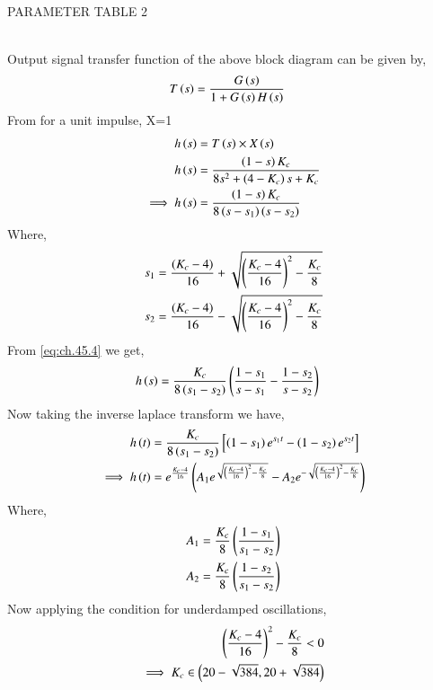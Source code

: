 \documentclass[journal,12pt,twocolumn]{IEEEtran}
\theoremstyle{remark}
\begin{document}
\begin{table}[ht]
    \centering
    
    \caption{PARAMETER TABLE 2}
    \label{tab:ch.45.2}
\end{table} \\
Output signal transfer function of the above block diagram can be given by,
\begin{align}
     T\left(s\right) &= \frac{G\left(s\right)}{1+G\left(s\right)H\left(s\right)}    
\end{align}
From 
for a unit impulse, X=1 \\
\begin{align}
    h\left(s\right) &= T\left(s\right)\times X\left(s\right)   \\
    h\left(s\right) &= \frac{\left(1-s\right)K_c}{8s^2 + \left(4-K_c\right)s + K_c}  \\
    \implies h\left(s\right) &= \frac{\left(1-s\right)K_c}{8\left(s-s_1\right)\left(s-s_2\right)}  \label{eq:ch.45.4}
\end{align}
Where,
\begin{align}
    s_1 &= \frac{\left(K_c-4\right)}{16} + \sqrt{\left(\frac{K_c-4}{16}\right)^2 - \frac{K_c}{8}}  \\
    s_2 &= \frac{\left(K_c-4\right)}{16} - \sqrt{\left(\frac{K_c-4}{16}\right)^2 - \frac{K_c}{8}} 
\end{align}
From \eqref{eq:ch.45.4} we get,
\begin{align}
    h\left(s\right) &= \frac{K_c}{8\left(s_1-s_2\right)}\left(\frac{1-s_1}{s-s_1}-\frac{1-s_2}{s-s_2}\right)
\end{align}
Now taking the inverse laplace transform we have,
\begin{align}
    h\left(t\right) &= \frac{K_c}{8\left(s_1-s_2\right)} \left [\left(1-s_1\right)e^{s_1t}-\left(1-s_2\right)e^{s_2t} \right ]  \\
    \implies h\left(t\right) &= e^{\frac{K_c-4}{16}}\left(A_1e^{\sqrt{\left(\frac{K_c-4}{16}\right)^2 - \frac{K_c}{8}}} - A_2e^{-\sqrt{\left(\frac{K_c-4}{16}\right)^2 - \frac{K_c}{8}}}\right)    
\end{align}
Where,
\begin{align}
    A_1 &= \frac{K_c}{8} \left(\frac{1-s_1}{s_1-s_2}\right)    \\
    A_2 &= \frac{K_c}{8} \left(\frac{1-s_2}{s_1-s_2}\right)    
\end{align}
Now applying the condition for underdamped oscillations,
\begin{align}
    \left(\frac{K_c-4}{16}\right)^2 - \frac{K_c}{8} < 0    \\
    \implies K_c \in \left(20-\sqrt{384} , 20+\sqrt{384}\right)   \label{eq:ch.45.13}
\end{align}
\end{document}
